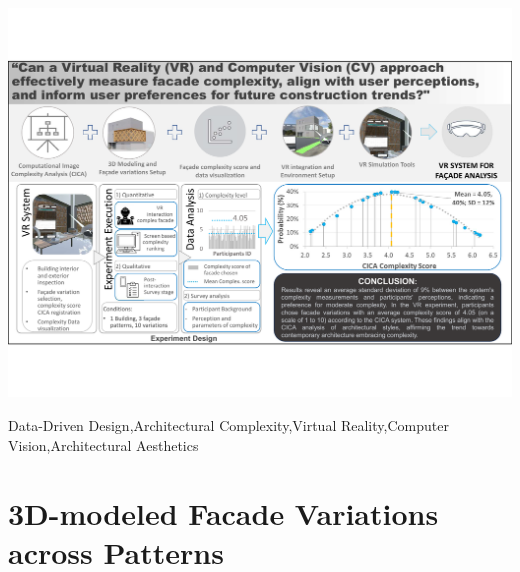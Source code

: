 \documentclass[5p,times]{elsarticle}%
\begin{document}
\begin{frontmatter}
\begin{graphicalabstract}
    \centering
    \includegraphics[width= \textwidth, trim = 0 80 0 80, clip]{Images/GraphicAbstract}
    \label{fig:graphic_abstract}
\end{graphicalabstract}

\begin{highlights}

\end{highlights}

\begin{keyword}
Data-Driven Design\sep Architectural Complexity\sep Virtual Reality\sep Computer Vision\sep Architectural Aesthetics

\end{keyword}

\end{frontmatter}
%







\appendix

\section{3D-modeled Facade Variations across Patterns}
\label{sec:AnnexVariations}

\end{document}
